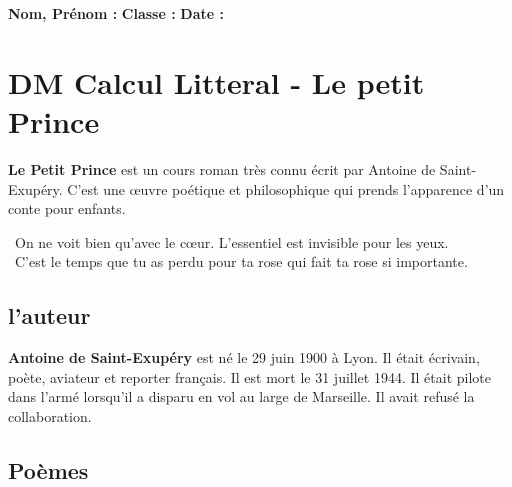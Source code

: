 \documentclass[12pt]{article}
\begin{document}

\newcommand{\Pointilles}[1][3]{%
  \multido{}{#1}{\makebox[\linewidth]{\dotfill}\\[\parskip]
}}


\setlength{\columnseprule}{1pt}

\textbf{Nom, Prénom :} \hspace{8cm} \textbf{Classe :} \hspace{3cm} \textbf{Date :}\\
\vspace{-0.8cm}

\section*{DM Calcul Litteral - Le petit Prince}

\textbf{Le Petit Prince} est un cours roman très connu écrit par Antoine de Saint-Exupéry. 
C'est une œuvre poétique et philosophique qui prends l'apparence d'un conte pour enfants. 

\begin{center}
  {\selectfont \og On ne voit bien qu'avec le cœur. L'essentiel est invisible pour les yeux. \fg }\\
  {\selectfont \og C'est le temps que tu as perdu pour ta rose qui fait ta rose si importante. \fg}\\

\end{center}

\subsection*{l’auteur }
\textbf{Antoine de Saint-Exupéry} est né le 29 juin 1900 à Lyon. Il était  écrivain, poète, aviateur et reporter français. Il est mort le 31 juillet 1944. Il était pilote dans l’armé lorsqu’il a disparu en vol au large de Marseille. Il avait refusé la collaboration.

\subsection*{Poèmes}
\end{document}
